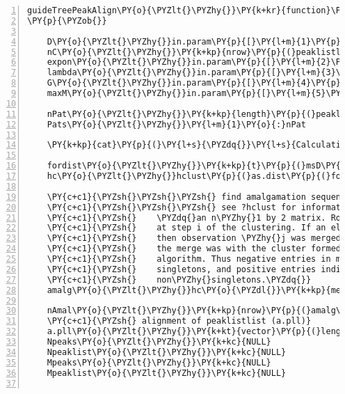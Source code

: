 \begin{Verbatim}[commandchars=\\\{\},codes={\catcode`\$=3\catcode`\^=7\catcode`\_=8},gobble=0,numbers=left,fontfamily=fvm,fontshape=n,fontsize=\footnotesize,tabsize=2]
guideTreePeakAlign\PY{o}{\PYZlt{}\PYZhy{}}\PY{k+kr}{function}\PY{p}{(}msD\PY{p}{,}peaklistlist\PY{p}{,}in.param\PY{p}{)}
\PY{p}{\PYZob{}}

	D\PY{o}{\PYZlt{}\PYZhy{}}in.param\PY{p}{[}\PY{l+m}{1}\PY{p}{]}
	nC\PY{o}{\PYZlt{}\PYZhy{}}\PY{k+kp}{nrow}\PY{p}{(}peaklistlist\PY{p}{[[}\PY{l+m}{1}\PY{p}{]]}\PY{p}{)}\PY{l+m}{\PYZhy{}1}
	expon\PY{o}{\PYZlt{}\PYZhy{}}in.param\PY{p}{[}\PY{l+m}{2}\PY{p}{]}
	lambda\PY{o}{\PYZlt{}\PYZhy{}}in.param\PY{p}{[}\PY{l+m}{3}\PY{p}{]}
	G\PY{o}{\PYZlt{}\PYZhy{}}in.param\PY{p}{[}\PY{l+m}{4}\PY{p}{]}
	maxM\PY{o}{\PYZlt{}\PYZhy{}}in.param\PY{p}{[}\PY{l+m}{5}\PY{p}{]}
	
	nPat\PY{o}{\PYZlt{}\PYZhy{}}\PY{k+kp}{length}\PY{p}{(}peaklistlist\PY{p}{)}
	Pats\PY{o}{\PYZlt{}\PYZhy{}}\PY{l+m}{1}\PY{o}{:}nPat
	
	\PY{k+kp}{cat}\PY{p}{(}\PY{l+s}{\PYZdq{}}\PY{l+s}{Calculating merge sequence for spectra \PYZbs{}n\PYZdq{}}\PY{p}{)}
		
	fordist\PY{o}{\PYZlt{}\PYZhy{}}\PY{k+kp}{t}\PY{p}{(}msD\PY{o}{\PYZdl{}}intensity\PY{p}{)}
	hc\PY{o}{\PYZlt{}\PYZhy{}}hclust\PY{p}{(}as.dist\PY{p}{(}fordist\PY{p}{,}diag\PY{o}{=}\PY{k+kc}{FALSE}\PY{p}{,}upper\PY{o}{=}\PY{k+kc}{FALSE}\PY{p}{)}\PY{p}{,}\PY{l+s}{\PYZdq{}}\PY{l+s}{average\PYZdq{}}\PY{p}{)}
	
	\PY{c+c1}{\PYZsh{}\PYZsh{}\PYZsh{} find amalgamation sequence}
	\PY{c+c1}{\PYZsh{}\PYZsh{}\PYZsh{} see ?hclust for information on the merge matrix:}
	\PY{c+c1}{\PYZsh{}    \PYZdq{}an n\PYZhy{}1 by 2 matrix. Row i of merge describes the merging of clusters }
	\PY{c+c1}{\PYZsh{}    at step i of the clustering. If an element j in the row is negative, }
	\PY{c+c1}{\PYZsh{}    then observation \PYZhy{}j was merged at this stage. If j is positive then }
	\PY{c+c1}{\PYZsh{}    the merge was with the cluster formed at the (earlier) stage j of the }
	\PY{c+c1}{\PYZsh{}    algorithm. Thus negative entries in merge indicate agglomerations of }
	\PY{c+c1}{\PYZsh{}    singletons, and positive entries indicate agglomerations of }
	\PY{c+c1}{\PYZsh{}    non\PYZhy{}singletons.\PYZdq{}}
	amalg\PY{o}{\PYZlt{}\PYZhy{}}hc\PY{o}{\PYZdl{}}\PY{k+kp}{merge}

	nAmal\PY{o}{\PYZlt{}\PYZhy{}}\PY{k+kp}{nrow}\PY{p}{(}amalg\PY{p}{)}
	\PY{c+c1}{\PYZsh{} alignment of peaklistlist (a.pll)}
	a.pll\PY{o}{\PYZlt{}\PYZhy{}}\PY{k+kt}{vector}\PY{p}{(}length\PY{o}{=}nAmal\PY{p}{,}mode\PY{o}{=}\PY{l+s}{\PYZdq{}}\PY{l+s}{list\PYZdq{}}\PY{p}{)}
	Npeaks\PY{o}{\PYZlt{}\PYZhy{}}\PY{k+kc}{NULL}
	Npeaklist\PY{o}{\PYZlt{}\PYZhy{}}\PY{k+kc}{NULL}
	Mpeaks\PY{o}{\PYZlt{}\PYZhy{}}\PY{k+kc}{NULL}
	Mpeaklist\PY{o}{\PYZlt{}\PYZhy{}}\PY{k+kc}{NULL}
	

\end{Verbatim}
